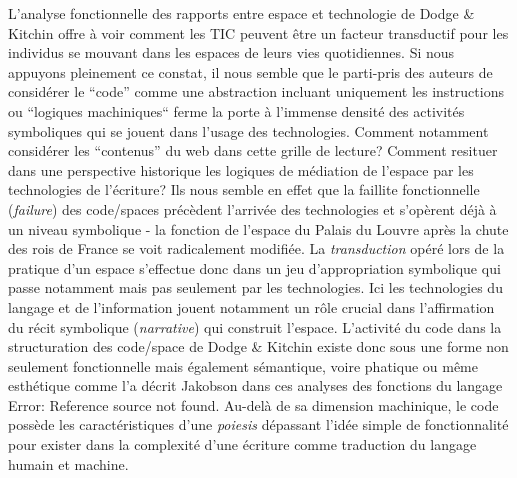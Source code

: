 {\color{black}
L'analyse fonctionnelle des rapports entre espace et technologie de Dodge \& Kitchin offre \`a voir comment les TIC
peuvent \^etre un facteur transductif pour les individus se mouvant dans les espaces de leurs vies quotidiennes. Si
nous appuyons pleinement ce constat, il nous semble que le parti-pris des auteurs de consid\'erer le ``code'' comme une
abstraction incluant uniquement les instructions ou ``logiques machiniques`` ferme la porte \`a l'immense densit\'e des
activit\'es symboliques qui se jouent dans l'usage des technologies. Comment notamment consid\'erer les ``contenus'' du
web dans cette grille de lecture? Comment resituer dans une perspective historique les logiques de m\'ediation de
l'espace par les technologies de l'\'ecriture? Ils nous semble en effet que la faillite fonctionnelle
(\textit{failure}) des code/spaces pr\'ec\`edent l'arriv\'ee des technologies et s'op\`erent d\'ej\`a \`a un niveau
symbolique - la fonction de l'espace du Palais du Louvre apr\`es la chute des rois de France se voit radicalement
modifi\'ee. La \textit{transduction} op\'er\'e lors de la pratique d'un espace s'effectue donc dans un jeu
d'appropriation symbolique qui passe notamment mais pas seulement par les technologies. Ici les technologies du langage
et de l'information jouent notamment un r\^ole crucial dans l'affirmation du r\'ecit symbolique (\textit{narrative})
qui construit l'espace. L'activit\'e du code dans la structuration des code/space de Dodge \& Kitchin existe donc sous
une forme non seulement fonctionnelle mais \'egalement s\'emantique, voire phatique ou m\^eme esth\'etique comme l'a
d\'ecrit Jakobson dans ces analyses des fonctions du langage Error: Reference source not found. Au-del\`a de sa
dimension machinique, le code poss\`ede les caract\'eristiques d'une \textit{poiesis }d\'epassant l'id\'ee simple de
fonctionnalit\'e pour exister dans la complexit\'e d'une \'ecriture comme traduction du langage humain et machine.}

